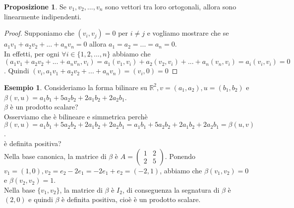 \documentclass[a4paper]{article}
\theoremstyle{definition}
\newtheorem*{es}{Esempio}
\newtheorem*{prop}{Proposizione}
\begin{document}
	\begin{prop}
		Se $v_1, v_2, ..., v_n$ sono vettori tra loro ortogonali, allora sono linearmente indipendenti.
	\end{prop}
	\begin{proof}
		Supponiamo che $(v_i, v_j) = 0$ per $i \ne j$ e vogliamo mostrare che se $a_1v_1 + a_2v_2 + ... + a_nv_n = 0$ allora $a_1 = a_2 = ... = a_n = 0$. \\
		In effetti, per ogni $\forall i \in \{1, 2, ..., n\}$ abbiamo che $(a_1v_1 + a_2v_2 + ... + a_nv_n, v_i) = a_1(v_1, v_i) + a_2(v_2, v_i) + ... + a_n(v_n, v_i) = a_i(v_i, v_i) = 0$.
		Quindi $(v_i, a_1v_1 + a_2v_2 + ... + a_nv_n) = (v_i, 0) = 0$
	\end{proof}

	\begin{es}
		Consideriamo la forma bilinare su $\mathbb{R}^2, v = (a_1, a_2), u = (b_1, b_2)$ e $\beta(v, u) = a_1b_1 + 5a_2b_2 + 2a_1b_2 + 2a_2b_1$. \\
		$\beta$ è un prodotto scalare? \\
		Osserviamo che è bilineare e simmetrica perchè $\beta(v, u) = a_1b_1 + 5a_2b_2 + 2a_1b_2 + 2a_2b_1 = a_1b_1 + 5a_2b_2 + 2a_1b_2 + 2a_2b_1 = \beta(u, v)$. \\
		è definita positiva? \\
		Nella base canonica, la matrice di $\beta$ è $A = \begin{pmatrix}
			1 & 2 \\
			2 & 5
		\end{pmatrix}$. Ponendo $v_1 = (1, 0), v_2 = e_2 - 2e_1 = -2e_1 + e_2 = (-2, 1)$, abbiamo che $\beta(v_1, v_2) = 0$ e $\beta(v_2, v_2) = 1$. \\
		Nella base $\{v_1, v_2\}$, la matrice di $\beta$ è $I_2$, di conseguenza la segnatura di $\beta$ è $(2, 0)$ e quindi $\beta$ è definita positiva, cioè è un prodotto scalare.
	\end{es}
\end{document}
